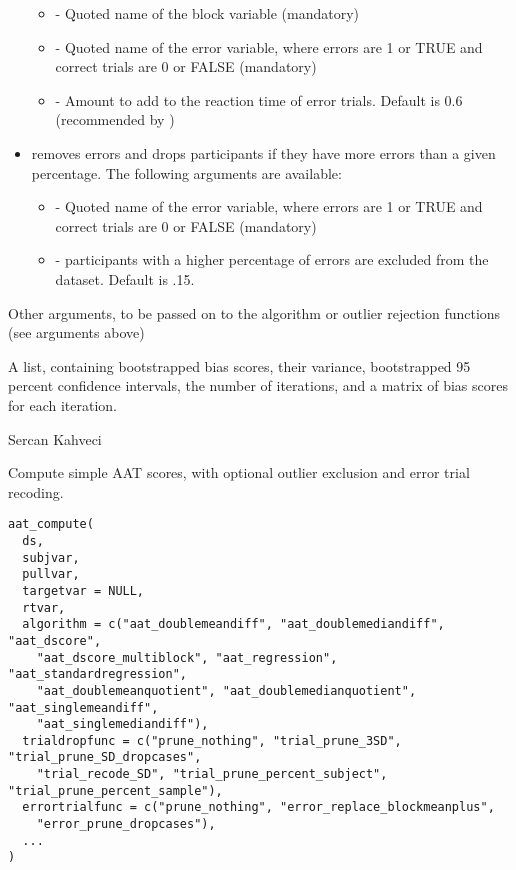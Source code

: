 \documentclass[a4paper]{book}
\begin{document}
\begin{Arguments}
\begin{ldescription}
\begin{itemize}
\begin{itemize}
\item{}  - Quoted name of the block variable (mandatory)
\item{}  - Quoted name of the error variable, where errors are 1 or TRUE and correct trials are 0 or FALSE (mandatory)
\item{}  - Amount to add to the reaction time of error trials. Default is 0.6 (recommended by )

\end{itemize}

\item{}  removes errors and drops participants if they have more errors than a given percentage. The following arguments are available:
\begin{itemize}

\item{}  - Quoted name of the error variable, where errors are 1 or TRUE and correct trials are 0 or FALSE (mandatory)
\item{}  - participants with a higher percentage of errors are excluded from the dataset. Default is .15.

\end{itemize}


\end{itemize}


\item[\code{...}] Other arguments, to be passed on to the algorithm or outlier rejection functions (see arguments above)
\end{ldescription}
\end{Arguments}
%
\begin{Value}
A list, containing bootstrapped bias scores, their variance, bootstrapped 95 percent confidence intervals,
the number of iterations, and a matrix of bias scores for each iteration.
\end{Value}
%
\begin{Author}\relax
Sercan Kahveci
\end{Author}
%
\begin{Description}\relax
Compute simple AAT scores, with optional outlier exclusion and error trial recoding.
\end{Description}
%
\begin{Usage}
\begin{verbatim}
aat_compute(
  ds,
  subjvar,
  pullvar,
  targetvar = NULL,
  rtvar,
  algorithm = c("aat_doublemeandiff", "aat_doublemediandiff", "aat_dscore",
    "aat_dscore_multiblock", "aat_regression", "aat_standardregression",
    "aat_doublemeanquotient", "aat_doublemedianquotient", "aat_singlemeandiff",
    "aat_singlemediandiff"),
  trialdropfunc = c("prune_nothing", "trial_prune_3SD", "trial_prune_SD_dropcases",
    "trial_recode_SD", "trial_prune_percent_subject", "trial_prune_percent_sample"),
  errortrialfunc = c("prune_nothing", "error_replace_blockmeanplus",
    "error_prune_dropcases"),
  ...
)
\end{verbatim}
\end{Usage}
\end{document}
